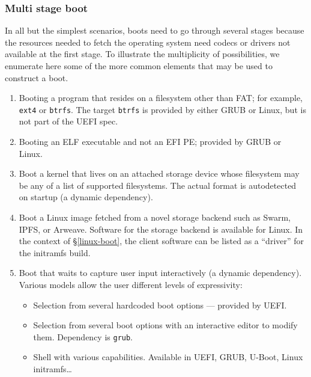 \subsubsection{Multi stage boot}

In all but the simplest scenarios, boots need to go through several stages because the resources needed to fetch the operating system need codecs or drivers not available at the first stage.
%
To illustrate the multiplicity of possibilities, we enumerate here some of the more common elements that may be used to construct a boot.

\begin{enumerate}
  \item Booting a program that resides on a filesystem other than FAT; for example, \texttt{ext4} or \texttt{btrfs}. 
  The target \texttt{btrfs} is provided by either GRUB or Linux, but is not part of the UEFI spec.
  
  \item Booting an ELF executable and not an EFI PE; provided by GRUB or Linux. 
  
  \item Boot a kernel that lives on an attached storage device whose filesystem may be any of a list of supported filesystems. 
  The actual format is autodetected on startup (a dynamic dependency). 
  
  \item Boot a Linux image fetched from a novel storage backend such as Swarm, IPFS, or Arweave.
  Software for the storage backend is available for Linux. 
  In the context of \S\ref{linux-boot}, the client software can be listed as a ``driver'' for the initramfs build.
  
  \item 
    Boot that waits to capture user input interactively (a dynamic dependency).
    Various models allow the user different levels of expressivity:
    \begin{itemize}
      \item Selection from several hardcoded boot options --- provided by UEFI.
      \item Selection from several boot options with an interactive editor to modify them. Dependency is \texttt{grub}.
      \item Shell with various capabilities. Available in UEFI, GRUB, U-Boot, Linux initramfs\ldots{} 
    \end{itemize}
\end{enumerate}

